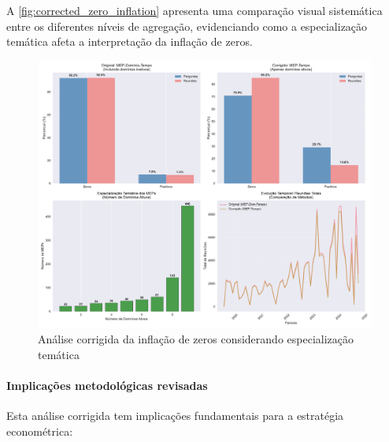 A \autoref{fig:corrected_zero_inflation} apresenta uma comparação visual sistemática entre os diferentes níveis de agregação, evidenciando como a especialização temática afeta a interpretação da inflação de zeros.

\begin{figure}[htbp]
\centering
\includegraphics[width=\textwidth]{figures/fig_corrected_zero_inflation_analysis.pdf}
\caption{Análise corrigida da inflação de zeros considerando especialização temática}
\label{fig:corrected_zero_inflation}
\end{figure}

\paragraph{Implicações metodológicas revisadas}

Esta análise corrigida tem implicações fundamentais para a estratégia econométrica:

